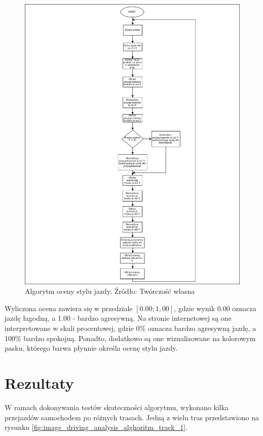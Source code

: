 \begin{figure}[H]
	\centering
	\includegraphics[width=15cm]{img/driving_analysis/driving_analysis.png}
	\caption{Algorytm oceny stylu jazdy. Źródło: Twórczość własna}
	\label{fig:image_driving_analysis_alghoritm}
\end{figure}

Wyliczona ocena zawiera się w przedziale $[0.00; 1,00]$, gdzie wynik 0.00 oznacza jazdę łagodną, a 1.00 - bardzo agresywną. Na stronie internetowej są one interpretowane w skali procentowej, gdzie 0\% oznacza bardzo agresywną jazdę, a 100\% bardzo spokojną. Ponadto, dodatkowo są one wizualizowane na kolorowym pasku, którego barwa płynnie określa ocenę stylu jazdy.


\section{Rezultaty}

W ramach dokonywania testów skuteczności algorytmu, wykonano kilka przejazdów samochodem po różnych trasach. Jedną z wielu tras przedstawiono na rysunku \ref{fig:image_driving_analysis_alghoritm_track_1}.

